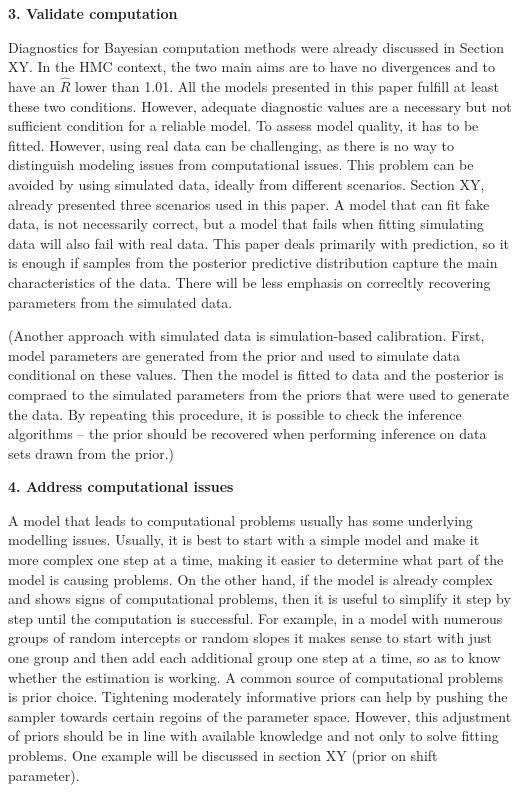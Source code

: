 \textbf{3. Validate computation}

Diagnostics for Bayesian computation methods were already discussed in Section XY.
In the HMC context, the two main aims are to have no divergences and to have an $\hat R$ lower than 1.01.
All the models presented in this paper fulfill at least these two conditions.
However, adequate diagnostic values are a necessary but not sufficient condition for a reliable model.
To assess model quality, it has to be fitted.
However, using real data can be challenging, as there is no way to distinguish modeling issues from computational issues.
This problem can be avoided by using simulated data, ideally from different scenarios.
Section XY, already presented three scenarios used in this paper.
A model that can fit fake data, is not necessarily correct, but a model that fails when fitting simulating data will also fail with real data.
This paper deals primarily with prediction, so it is enough if samples from the posterior predictive distribution capture the main characteristics of the data.
There will be less emphasis on correcltly recovering parameters from the simulated data.

(Another approach with simulated data is simulation-based calibration.
First, model parameters are generated from the prior and used to simulate data conditional on these values.
Then the model is fitted to data and the posterior is compraed to the simulated parameters from the priors that were used to generate the data.
By repeating this procedure, it is possible to check the inference algorithms – the prior should be recovered when performing inference on data sets drawn from the prior.)

\textbf{4. Address computational issues}

A model that leads to computational problems usually has some underlying modelling issues.
Usually, it is best to start with a simple model and make it more complex one step at a time, making it easier to determine what part of the model is causing problems.
On the other hand, if the model is already complex and shows signs of computational problems, then it is useful to simplify it step by step until the computation is successful.
For example, in a model with numerous groups of random intercepts or random slopes it makes sense to start with just one group and then add each additional group one step at a time, so as to know whether the estimation is working.
A common source of computational problems is prior choice.
Tightening moderately informative priors can help by pushing the sampler towards certain regoins of the parameter space.
However, this adjustment of priors should be in line with available knowledge and not only to solve fitting problems.
One example will be discussed in section XY (prior on shift parameter).

